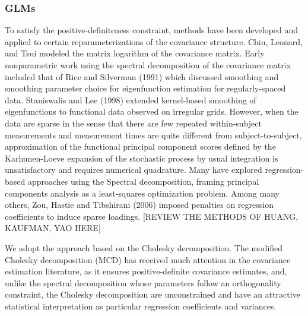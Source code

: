 \documentclass[12pt]{article}
\newcommand*\needsparaphrased{\color{red}}
\theoremstyle{definition}
\begin{document}
{{\subsubsection{GLMs }

To satisfy the positive-definiteness constraint, methods have been developed and applied to certain reparameterizations of the covariance structure. Chiu, Leonard, and Tsui modeled the matrix logarithm of the covariance matrix. Early nonparametric work using the spectral decomposition of the covariance matrix included that of Rice and Silverman (1991) which discussed smoothing and smoothing parameter choice for eigenfunction estimation for regularly-spaced data. Staniswalis and Lee (1998) extended kernel-based smoothing of eigenfunctions to functional data observed on irregular grids. However, when the data are sparse in the sense that there are few repeated within-subject measurements and measurement times are quite different from subject-to-subject, approximation of the functional principal component scores defined by the Karhunen-Loeve expansion of the stochastic process by usual integration is unsatisfactory and requires numerical quadrature. Many have explored regression-based approaches using the Spectral decomposition, framing principal components analysis as a least-squares optimization problem. Among many others, Zou, Hastie and Tibshirani (2006) imposed penalties on regression coefficients to induce sparse loadings. {\needsparaphrased[REVIEW THE METHODS OF HUANG, KAUFMAN, YAO HERE]}


\bigskip
We adopt the approach based on the Cholesky decomposition. The modified Cholesky decomposition (MCD) has received much attention in the covariance estimation literature, as it ensures positive-definite covariance estimates, and, unlike the spectral decomposition whose parameters follow an orthogonality constraint, the Cholesky decomposition are unconstrained and have an attractive statistical interpretation as particular regression coefficients and variances.  
{\needsparaphrased{The Cholesky decomposition is similar to the spectral decomposition in that ? is diagonalized by a lower triangular matrix T: 

\[
T \Sigma T' = D,
\]
where the nonredundant entries of T are unconstrained and more meaningful statistically than those of the orthogonal matrix of the spectral decomposition. The matrix T is constructed from the regression coefficients when yt is regressed on its predecessors:

}}}}
\end{document}
